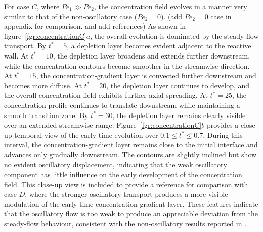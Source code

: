 \documentclass[lineno]{JFM-FLM_Au}
\begin{document}
{For case $C$, where $Pe_1 \gg Pe_2$, the concentration field evolves in a manner very similar to that of the non-oscillatory case ($Pe_2 = 0$). {\color{magenta}(add $Pe_2=0$ case in appendix for comparison. and add references)}  As shown in figure~\ref{fgr:concentrationC}$a$, the overall evolution is dominated by the steady-flow transport. By $t^* = 5$, a depletion layer becomes evident adjacent to the reactive wall. At $t^* = 10$, the depletion layer broadens and extends further downstream, while the concentration contours become smoother in the streamwise direction. At $t^* = 15$, the concentration-gradient layer is convected further downstream and becomes more diffuse. At $t^* = 20$, the depletion layer continues to develop, and the overall concentration field exhibits further axial spreading. At $t^* = 25$, the concentration profile continues to translate downstream while maintaining a smooth transition zone. By $t^* = 30$, the depletion layer remains clearly visible over an extended streamwise range. Figure~\ref{fgr:concentrationC}$b$ provides a close-up temporal view of the early-time evolution over $0.1 \leq t^* \leq 0.7$. During this interval, the concentration-gradient layer remains close to the initial interface and advances only gradually downstream. The contours are slightly inclined but show no evident oscillatory displacement, indicating that the weak oscillatory component has little influence on the early development of the concentration field. This close-up view is included to provide a reference for comparison with case $D$, where the stronger oscillatory transport produces a more visible modulation of the early-time concentration-gradient layer. These features indicate that the oscillatory flow is too weak to produce an appreciable deviation from the steady-flow behaviour, consistent with the non-oscillatory results reported in \citet{Huang2023}.

}
\end{document}
